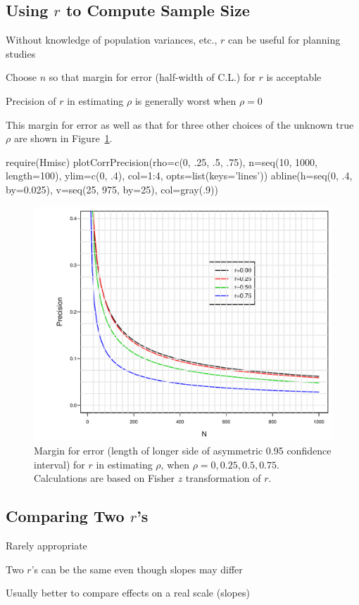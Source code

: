 \subsection{Using $r$ to Compute Sample Size}
\bi
\item Without knowledge of population variances, etc., $r$ can be
  useful for planning studies
\item Choose $n$ so that margin for error (half-width of C.L.) for $r$
  is acceptable
\item Precision of $r$ in estimating $\rho$ is generally worst when $\rho=0$
\item This margin for error as well as that for three other choices of the unknown true $\rho$ are shown in Figure~\ref{fig:corr-moe}.
\begin{Schunk}
\begin{Sinput}
require(Hmisc)
plotCorrPrecision(rho=c(0, .25, .5, .75),
                  n=seq(10, 1000, length=100),
                  ylim=c(0, .4), col=1:4, opts=list(keys='lines'))
abline(h=seq(0, .4, by=0.025),
       v=seq(25, 975, by=25), col=gray(.9))
\end{Sinput}
\begin{figure}[htbp]

\centerline{\includegraphics{corr-moe-1} }

\caption[Margin of error for estimating correlation coefficient]{Margin for error (length of longer side of asymmetric 0.95 confidence interval) for $r$ in estimating $\rho$, when $\rho=0, 0.25, 0.5, 0.75$.  Calculations are based on Fisher $z$ transformation of $r$.}\label{fig:corr-moe}
\end{figure}
\end{Schunk}
\ei

\subsection{Comparing Two $r$'s}
\bi
\item Rarely appropriate
\item Two $r$'s can be the same even though slopes may differ
\item Usually better to compare effects on a real scale (slopes)
\ei
